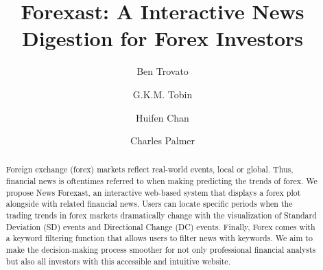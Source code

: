 \documentclass[sigconf]{acmart}
\begin{document}
\title{Forexast: A Interactive News Digestion for Forex Investors}

\author{Ben Trovato}
\author{G.K.M. Tobin}
\authornotemark[1]



\author{Huifen Chan}

\author{Charles Palmer}


\renewcommand{\shortauthors}{Trovato and Tobin, et al.}

\begin{abstract}
Foreign exchange (forex) markets reflect real-world events, local or global.  Thus,  financial news is oftentimes referred to when making predicting the trends of forex. We propose News Forexast,  an interactive web-based system that displays a forex plot alongside with related financial news. Users can locate specific periods when the trading trends in forex markets dramatically change with the visualization of Standard Deviation (SD) events and Directional Change (DC) events. Finally, Forex comes with a keyword filtering function that allows users to filter news with keywords. We aim to make the decision-making process smoother for not only professional financial analysts but also all investors with this accessible and intuitive website.
\end{abstract}
\end{document}
